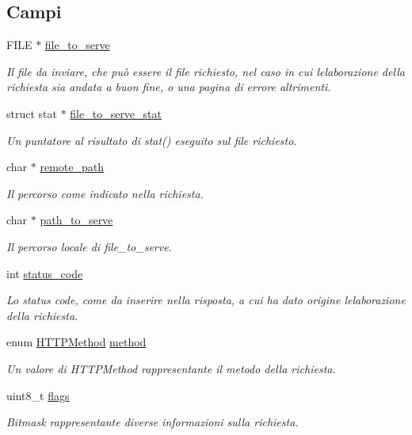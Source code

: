 \subsection*{Campi}
\begin{DoxyCompactItemize}
\item 
F\+I\+L\+E $\ast$ \hyperlink{structHTTPRequestData_a52def24a4e2fefab7c723751b4ca5a7b}{file\+\_\+to\+\_\+serve}
\begin{DoxyCompactList}\small\item\em Il file da inviare, che può essere il file richiesto, nel caso in cui l\textquotesingle{}elaborazione della richiesta sia andata a buon fine, o una pagina di errore altrimenti. \end{DoxyCompactList}\item 
struct stat $\ast$ \hyperlink{structHTTPRequestData_acf9615119994e2784a395f3b5b80f710}{file\+\_\+to\+\_\+serve\+\_\+stat}
\begin{DoxyCompactList}\small\item\em Un puntatore al risultato di stat() eseguito sul file richiesto. \end{DoxyCompactList}\item 
char $\ast$ \hyperlink{structHTTPRequestData_a04c7c946a943f429f2529cf220076c26}{remote\+\_\+path}
\begin{DoxyCompactList}\small\item\em Il percorso come indicato nella richiesta. \end{DoxyCompactList}\item 
char $\ast$ \hyperlink{structHTTPRequestData_a71bcae8a8f14feb676826a6b8a76604e}{path\+\_\+to\+\_\+serve}
\begin{DoxyCompactList}\small\item\em Il percorso locale di file\+\_\+to\+\_\+serve. \end{DoxyCompactList}\item 
int \hyperlink{structHTTPRequestData_a47c202aa745d8a5eb2a5dc7cbc3087aa}{status\+\_\+code}
\begin{DoxyCompactList}\small\item\em Lo status code, come da inserire nella risposta, a cui ha dato origine l\textquotesingle{}elaborazione della richiesta. \end{DoxyCompactList}\item 
enum \hyperlink{httpheaders_8h_a837a089a977b319a11edfb8022d9e47d}{H\+T\+T\+P\+Method} \hyperlink{structHTTPRequestData_af309a4c6a758b62689eeb327b5e09737}{method}
\begin{DoxyCompactList}\small\item\em Un valore di H\+T\+T\+P\+Method rappresentante il metodo della richiesta. \end{DoxyCompactList}\item 
uint8\+\_\+t \hyperlink{structHTTPRequestData_ac3bd527bd3e00ce219bfa72dbaea2351}{flags}
\begin{DoxyCompactList}\small\item\em Bitmask rappresentante diverse informazioni sulla richiesta. \end{DoxyCompactList}\end{DoxyCompactItemize}
